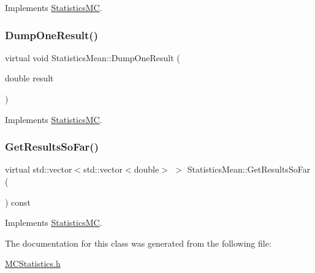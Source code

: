 Implements \hyperlink{classStatisticsMC_af716d17e088d36f283e112ba736f8002}{Statistics\+MC}.

\hypertarget{classStatisticsMean_a4e57d592c77b52e1d8b3985ab221c33c}{}\label{classStatisticsMean_a4e57d592c77b52e1d8b3985ab221c33c} 
\subsubsection{\texorpdfstring{Dump\+One\+Result()}{DumpOneResult()}}
{\footnotesize\ttfamily virtual void Statistics\+Mean\+::\+Dump\+One\+Result (\begin{DoxyParamCaption}\item[{double}]{result }\end{DoxyParamCaption})\hspace{0.3cm}{\ttfamily [virtual]}}



Implements \hyperlink{classStatisticsMC_a3ab5fb27d6933d8e35b2a55c3897cbe3}{Statistics\+MC}.

\hypertarget{classStatisticsMean_acc9e8c9d9bfa37917845c45ef266b287}{}\label{classStatisticsMean_acc9e8c9d9bfa37917845c45ef266b287} 
\subsubsection{\texorpdfstring{Get\+Results\+So\+Far()}{GetResultsSoFar()}}
{\footnotesize\ttfamily virtual std\+::vector$<$std\+::vector$<$double$>$ $>$ Statistics\+Mean\+::\+Get\+Results\+So\+Far (\begin{DoxyParamCaption}{ }\end{DoxyParamCaption}) const\hspace{0.3cm}{\ttfamily [virtual]}}



Implements \hyperlink{classStatisticsMC_ae29a294b6db36c2bf46c20ac30e25aad}{Statistics\+MC}.



The documentation for this class was generated from the following file\+:\begin{DoxyCompactItemize}
\item 
\hyperlink{MCStatistics_8h}{M\+C\+Statistics.\+h}\end{DoxyCompactItemize}
